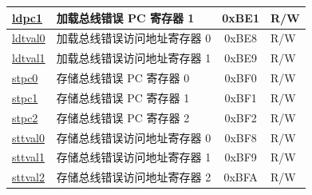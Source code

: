 \begin{longtable}{ | p{4.0cm} | p{8.4cm} | c | l | }
\hyperref[regdesc:LDPC1]{ldpc1} & 加载总线错误 PC 寄存器 1 & 0xBE1 & R/W \\\hline
\hyperref[regdesc:LDTVAL0]{ldtval0} & 加载总线错误访问地址寄存器 0 & 0xBE8 & R/W \\\hline
\hyperref[regdesc:LDTVAL1]{ldtval1} & 加载总线错误访问地址寄存器 1 & 0xBE9 & R/W \\\hline
\hyperref[regdesc:STPC0]{stpc0} & 存储总线错误 PC 寄存器 0 & 0xBF0 & R/W \\\hline
\hyperref[regdesc:STPC1]{stpc1} & 存储总线错误 PC 寄存器 1 & 0xBF1 & R/W \\\hline
\hyperref[regdesc:STPC2]{stpc2} & 存储总线错误 PC 寄存器 2 & 0xBF2 & R/W \\\hline
\hyperref[regdesc:STTVAL0]{sttval0} & 存储总线错误访问地址寄存器 0 & 0xBF8 & R/W \\\hline
\hyperref[regdesc:STTVAL1]{sttval1} & 存储总线错误访问地址寄存器 1 & 0xBF9 & R/W \\\hline
\hyperref[regdesc:STTVAL2]{sttval2} & 存储总线错误访问地址寄存器 2 & 0xBFA & R/W \\\hline
\end{longtable}
